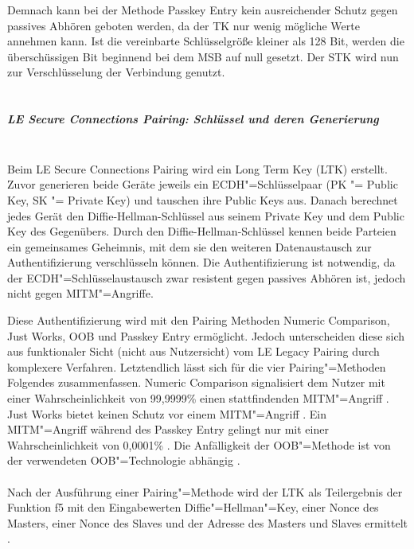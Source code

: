 Demnach kann bei der Methode Passkey Entry kein ausreichender Schutz gegen passives Abhören geboten werden, da der TK nur wenig mögliche Werte annehmen kann. Ist die vereinbarte Schlüsselgröße kleiner als 128 Bit, werden die überschüssigen Bit beginnend bei dem MSB auf null gesetzt. Der STK wird nun zur Verschlüsselung der Verbindung genutzt. \cite{BtSpec4.2_2305-2306}
\\\\
\subparagraph{LE Secure Connections Pairing: Schlüssel und deren Generierung} \mbox{} \vspace{0.2cm} \\
Beim LE Secure Connections Pairing wird ein Long Term Key (LTK) erstellt. Zuvor generieren beide Geräte jeweils ein ECDH"=Schlüsselpaar (PK "= Public Key, SK "= Private Key) und tauschen ihre Public Keys aus. Danach berechnet jedes Gerät den Diffie-Hellman-Schlüssel aus seinem Private Key und dem Public Key des Gegenübers. Durch den Diffie-Hellman-Schlüssel kennen beide Parteien ein gemeinsames Geheimnis, mit dem sie den weiteren Datenaustausch zur Authentifizierung verschlüsseln können. Die Authentifizierung ist notwendig, da der ECDH"=Schlüsselaustausch zwar resistent gegen passives Abhören ist, jedoch nicht gegen MITM"=Angriffe. \cite{BtSpec4.2_2307}

Diese Authentifizierung wird mit den Pairing Methoden Numeric Comparison, Just Works, OOB und Passkey Entry ermöglicht. Jedoch unterscheiden diese sich aus funktionaler Sicht (nicht aus Nutzersicht) vom LE Legacy Pairing durch komplexere Verfahren. Letztendlich lässt sich für die vier Pairing"=Methoden Folgendes zusammenfassen. 
Numeric Comparison signalisiert dem Nutzer mit einer Wahrscheinlichkeit von 99,9999\% einen stattfindenden MITM"=Angriff \cite{BtSpec4.2_2309}. 
Just Works bietet keinen Schutz vor einem MITM"=Angriff \cite{BtSpec4.2_245}.
Ein MITM"=Angriff während des Passkey Entry gelingt nur mit einer Wahrscheinlichkeit von 0,0001\% \cite{BtSpec4.2_2311}.
Die Anfälligkeit der OOB"=Methode ist von der verwendeten OOB"=Technologie abhängig \cite{BtSpec4.2_2312-2313}.
\\\\
Nach der Ausführung einer Pairing"=Methode wird der LTK als Teilergebnis der Funktion f5 \cite{BtSpec4.2_2292-2293} 
mit den Eingabewerten Diffie"=Hellman"=Key, einer Nonce des Masters, einer Nonce des Slaves und der Adresse des Masters und Slaves ermittelt \cite{BtSpec4.2_2314}.

